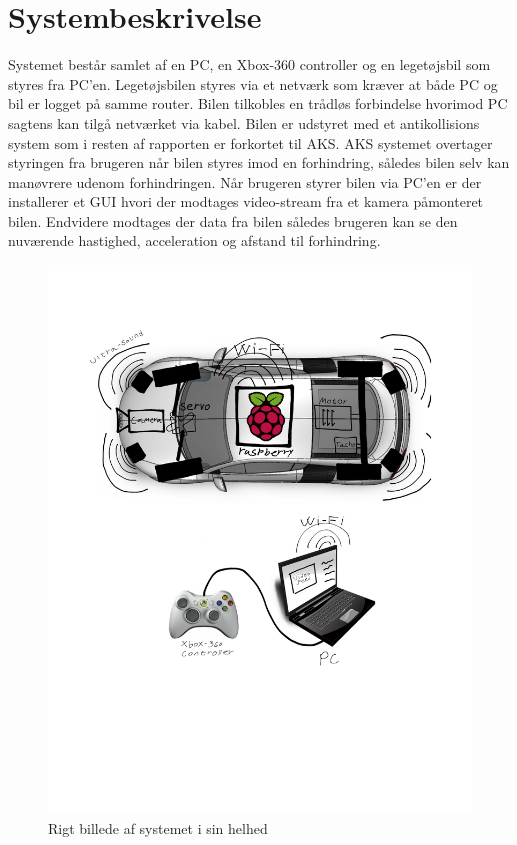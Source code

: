 \chapter{Systembeskrivelse} \label{ch:Systembeskrivelse}
Systemet består samlet af en PC, en Xbox-360 controller og en legetøjsbil som styres fra PC'en. Legetøjsbilen styres via et netværk som kræver at både PC og bil er logget på samme router. Bilen tilkobles en trådløs forbindelse hvorimod PC sagtens kan tilgå netværket via kabel. Bilen er udstyret med et antikollisions system som i resten af rapporten er forkortet til AKS. AKS systemet overtager styringen fra brugeren når bilen styres imod en forhindring, således bilen selv kan manøvrere udenom forhindringen. Når brugeren styrer bilen via PC'en er der installerer et GUI hvori der modtages video-stream fra et kamera påmonteret bilen. Endvidere modtages der data fra bilen således brugeren kan se den nuværende hastighed, acceleration og afstand til forhindring. 

\begin{figure}[H]
\centering
\includegraphics[width=\textwidth - 7.38 cm]{../fig/billeder/rigbillede}
\caption{Rigt billede af systemet i sin helhed}
\label{fig:rigbillede}
\end{figure} 



